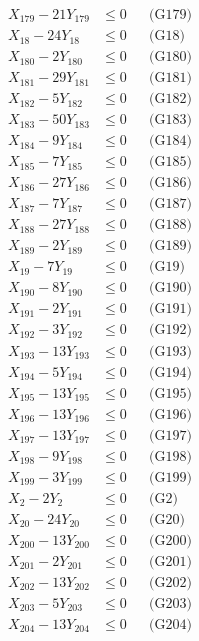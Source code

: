 \documentclass[a4paper,10pt]{article}
\begin{document}
{\begin{align}
X_{179} - 21Y_{179} &\leq 0 && \text{(G179)} \\
X_{18} - 24Y_{18} &\leq 0 && \text{(G18)} \\
X_{180} - 2Y_{180} &\leq 0 && \text{(G180)} \\
X_{181} - 29Y_{181} &\leq 0 && \text{(G181)} \\
X_{182} - 5Y_{182} &\leq 0 && \text{(G182)} \\
X_{183} - 50Y_{183} &\leq 0 && \text{(G183)} \\
X_{184} - 9Y_{184} &\leq 0 && \text{(G184)} \\
X_{185} - 7Y_{185} &\leq 0 && \text{(G185)} \\
X_{186} - 27Y_{186} &\leq 0 && \text{(G186)} \\
X_{187} - 7Y_{187} &\leq 0 && \text{(G187)} \\
X_{188} - 27Y_{188} &\leq 0 && \text{(G188)} \\
\allowbreak
X_{189} - 2Y_{189} &\leq 0 && \text{(G189)} \\
X_{19} - 7Y_{19} &\leq 0 && \text{(G19)} \\
X_{190} - 8Y_{190} &\leq 0 && \text{(G190)} \\
X_{191} - 2Y_{191} &\leq 0 && \text{(G191)} \\
X_{192} - 3Y_{192} &\leq 0 && \text{(G192)} \\
X_{193} - 13Y_{193} &\leq 0 && \text{(G193)} \\
X_{194} - 5Y_{194} &\leq 0 && \text{(G194)} \\
X_{195} - 13Y_{195} &\leq 0 && \text{(G195)} \\
X_{196} - 13Y_{196} &\leq 0 && \text{(G196)} \\
X_{197} - 13Y_{197} &\leq 0 && \text{(G197)} \\
X_{198} - 9Y_{198} &\leq 0 && \text{(G198)} \\
X_{199} - 3Y_{199} &\leq 0 && \text{(G199)} \\
X_{2} - 2Y_{2} &\leq 0 && \text{(G2)} \\
X_{20} - 24Y_{20} &\leq 0 && \text{(G20)} \\
X_{200} - 13Y_{200} &\leq 0 && \text{(G200)} \\
X_{201} - 2Y_{201} &\leq 0 && \text{(G201)} \\
X_{202} - 13Y_{202} &\leq 0 && \text{(G202)} \\
X_{203} - 5Y_{203} &\leq 0 && \text{(G203)} \\
X_{204} - 13Y_{204} &\leq 0 && \text{(G204)} \\

\end{align}}
\end{document}
